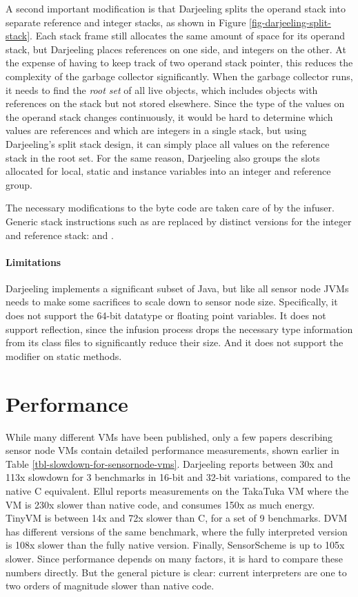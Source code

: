 A second important modification is that Darjeeling splits the operand stack into separate reference and integer stacks, as shown in Figure \ref{fig-darjeeling-split-stack}. Each stack frame still allocates the same amount of space for its operand stack, but Darjeeling places references on one side, and integers on the other. At the expense of having to keep track of two operand stack pointer, this reduces the complexity of the garbage collector significantly. When the garbage collector runs, it needs to find the \emph{root set} of all live objects, which includes objects with references on the stack but not stored elsewhere. Since the type of the values on the operand stack changes continuously, it would be hard to determine which values are references and which are integers in a single stack, but using Darjeeling's split stack design, it can simply place all values on the reference stack in the root set. For the same reason, Darjeeling also groups the slots allocated for local, static and instance variables into an integer and reference group.

The necessary modifications to the byte code are taken care of by the infuser. Generic stack instructions such as  are replaced by distinct versions for the integer and reference stack:  and .

\paragraph{Limitations}
Darjeeling implements a significant subset of Java, but like all sensor node JVMs needs to make some sacrifices to scale down to sensor node size. Specifically, it does not support the 64-bit  datatype or floating point variables. It does not support reflection, since the infusion process drops the necessary type information from its class files to significantly reduce their size. And it does not support the  modifier on static methods.

\section{Performance}
While many different VMs have been published, only a few papers describing sensor node VMs contain detailed performance measurements, shown earlier in Table \ref{tbl-slowdown-for-sensornode-vms}. Darjeeling \cite{Brouwers:2009cj} reports between 30x and 113x slowdown for 3 benchmarks in 16-bit and 32-bit variations, compared to the native C equivalent. Ellul \cite{Ellul:2012thesis} reports measurements on the TakaTuka VM \cite{Aslam:2008} where the VM is 230x slower than native code, and consumes 150x as much energy. TinyVM \cite{Hong:2012wj} is between 14x and 72x slower than C, for a set of 9 benchmarks. DVM \cite{Balani:2006} has different versions of the same benchmark, where the fully interpreted version is 108x slower than the fully native version. Finally, SensorScheme \cite{Evers:2010ur} is up to 105x slower. Since performance depends on many factors, it is hard to compare these numbers directly. But the general picture is clear: current interpreters are one to two orders of magnitude slower than native code.

